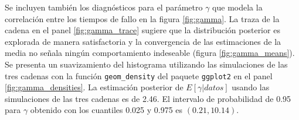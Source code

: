 \documentclass[11pt,a4paper]{article}
\begin{document}
\clearpage

Se incluyen también los diagnósticos para el parámetro $\gamma$ que modela la correlación entre los tiempos de fallo en la figura \ref{fig:gamma}. La traza de la cadena en el panel \ref{fig:gamma_trace} sugiere que la distribución posterior es explorada de manera satisfactoria y la convergencia de las estimaciones de la media no señala ningún comportamiento indeseable (figura \ref{fig:gamma_means}). Se presenta un suavizamiento del histograma utilizando las simulaciones de las tres cadenas con la función \texttt{geom\_density} del paquete \texttt{ggplot2} \citep{ggplot} en el panel \ref{fig:gamma_densities}. La estimación posterior de $E \left[ \gamma | datos \right]$ usando las simulaciones de las tres cadenas es de 2.46. El intervalo de probabilidad de 0.95 para $\gamma$ obtenido con los cuantiles 0.025 y 0.975 es $(0.21, 10.14)$.
\end{document}
